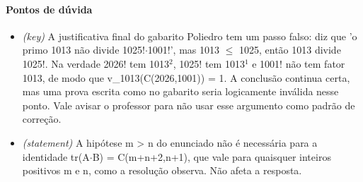 \documentclass{article}%
\begin{document}
\paragraph{Pontos de dúvida}%
\begin{itemize}%
\item%
\textit{(key)} A justificativa final do gabarito Poliedro tem um passo falso: diz que 'o primo 1013 não divide 1025!$\cdot$1001!', mas 1013 $\leq$ 1025, então 1013 divide 1025!. Na verdade 2026! tem 1013$^2$, 1025! tem 1013$^{1}$ e 1001! não tem fator 1013, de modo que v\_1013(C(2026,1001)) = 1. A conclusão continua certa, mas uma prova escrita como no gabarito seria logicamente inválida nesse ponto. Vale avisar o professor para não usar esse argumento como padrão de correção.%
\item%
\textit{(statement)} A hipótese m > n do enunciado não é necessária para a identidade tr(A$\cdot$B) = C(m+n+2,n+1), que vale para quaisquer inteiros positivos m e n, como a resolução observa. Não afeta a resposta.%
\end{itemize}%
\end{document}
